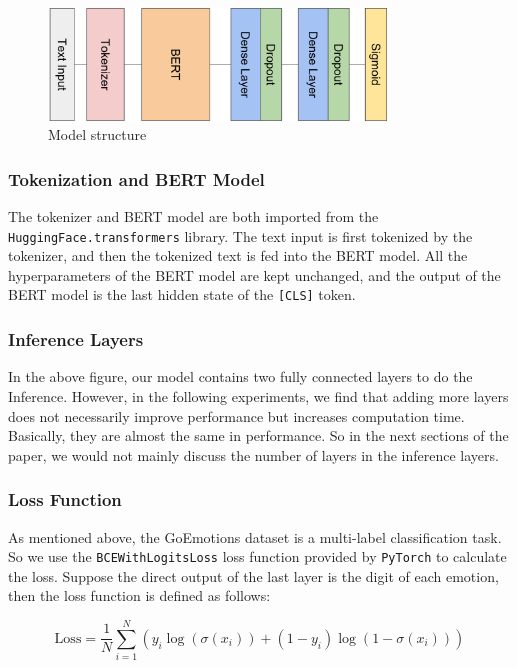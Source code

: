 \documentclass{article}
\begin{document}
\begin{figure}[H]
  \centering
  \includegraphics[width=0.8\textwidth]{img3.png}
  \caption{Model structure}
\end{figure}

\subsubsection{Tokenization and BERT Model}

The tokenizer and BERT model are both imported from the \texttt{HuggingFace.transformers} library. The text input is first tokenized by the tokenizer, and then the tokenized text is fed into the BERT model. All the hyperparameters of the BERT model are kept unchanged, and the output of the BERT model is the last hidden state of the \texttt{[CLS]} token.

\subsubsection{Inference Layers}

In the above figure, our model contains two fully connected layers to do the Inference. However, in the following experiments, we find that adding more layers does not necessarily improve performance but increases computation time. Basically, they are almost the same in performance. So in the next sections of the paper, we would not mainly discuss the number of layers in the inference layers.

\subsubsection{Loss Function}

As mentioned above, the GoEmotions dataset is a multi-label classification task. So we use the \texttt{BCEWithLogitsLoss} loss function provided by \texttt{PyTorch} to calculate the loss. Suppose the direct output of the last layer is the digit of each emotion, then the loss function is defined as follows:

$$
  \text{Loss} =  \frac{1}{N}\sum_{i = 1} ^{N} \left(y_i \log (\sigma(x_i)) + (1 - y_i)\log(1 - \sigma(x_i))\right)
$$
\end{document}
